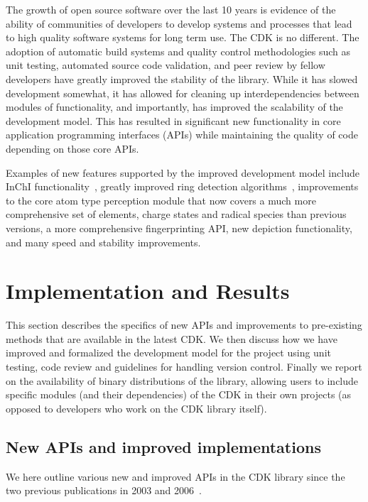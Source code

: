\documentclass[doublespacing]{bmcart}
\begin{document}
The growth of open source software over the last 10 years is evidence           %
of the ability of communities of developers to develop systems and
processes that lead to high quality software systems for long term
use. The CDK is no different. The adoption of automatic build systems
and quality control methodologies such as unit testing, automated
source code validation, and peer review by fellow developers have
greatly improved the stability of the library. While it has slowed
development somewhat, it has allowed for cleaning up interdependencies
between modules of functionality, and importantly, has improved the scalability
of the development model.  This has resulted in significant new
functionality in core application programming interfaces (APIs)
while maintaining the quality of code depending on those core APIs.

Examples of new features supported by the improved development model
include InChI functionality~\cite{Spjuth2013}, greatly improved ring
detection algorithms~\cite{May2014}, improvements to the core atom
type perception module that now covers a much more comprehensive set
of elements, charge states and radical species than previous versions,
a more comprehensive fingerprinting API, new depiction functionality,
and many speed and stability improvements.

\section*{Implementation and Results}

This section describes the specifics of new APIs and
improvements to pre-existing methods that are available in the latest
CDK.  We then discuss how we have improved and formalized the
development model for the project using unit testing, code review and
guidelines for handling version control. Finally we report on the
availability of binary distributions of the library, allowing users to
include specific modules (and their dependencies) of the CDK in their
own projects (as opposed to developers who work on the CDK library
itself).

\subsection*{New APIs and improved implementations}

We here outline various new and improved APIs in the CDK library since the
two previous publications in 2003 and 2006~\cite{Steinbeck2003,Steinbeck2006}.
\end{document}
